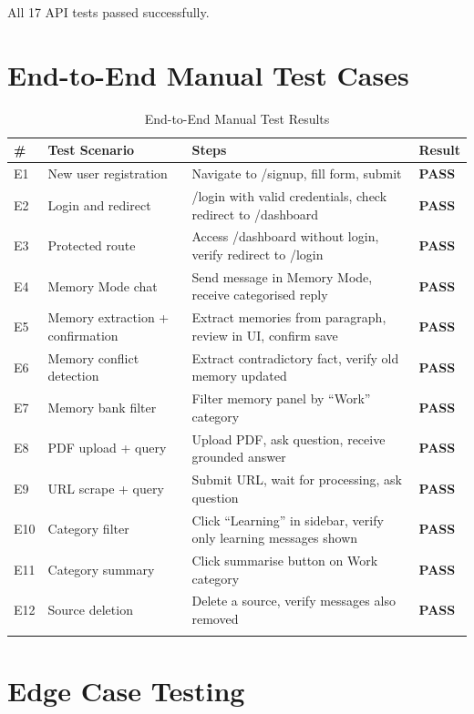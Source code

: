 \documentclass[12pt,a4paper]{report}
\begin{document}
All 17 API tests passed successfully.

\section{End-to-End Manual Test Cases}

\begin{longtable}{@{}p{0.5cm} p{3.5cm} p{5cm} p{3cm}@{}}
\toprule
\textbf{\#} & \textbf{Test Scenario} & \textbf{Steps} & \textbf{Result} \\
\midrule
\endhead
E1 & New user registration & Navigate to /signup, fill form, submit & \textbf{PASS} \\
E2 & Login and redirect & /login with valid credentials, check redirect to /dashboard & \textbf{PASS} \\
E3 & Protected route & Access /dashboard without login, verify redirect to /login & \textbf{PASS} \\
E4 & Memory Mode chat & Send message in Memory Mode, receive categorised reply & \textbf{PASS} \\
E5 & Memory extraction + confirmation & Extract memories from paragraph, review in UI, confirm save & \textbf{PASS} \\
E6 & Memory conflict detection & Extract contradictory fact, verify old memory updated & \textbf{PASS} \\
E7 & Memory bank filter & Filter memory panel by ``Work'' category & \textbf{PASS} \\
E8 & PDF upload + query & Upload PDF, ask question, receive grounded answer & \textbf{PASS} \\
E9 & URL scrape + query & Submit URL, wait for processing, ask question & \textbf{PASS} \\
E10 & Category filter & Click ``Learning'' in sidebar, verify only learning messages shown & \textbf{PASS} \\
E11 & Category summary & Click summarise button on Work category & \textbf{PASS} \\
E12 & Source deletion & Delete a source, verify messages also removed & \textbf{PASS} \\
\bottomrule
\caption{End-to-End Manual Test Results}
\label{tab:e2e_tests}
\end{longtable}

\section{Edge Case Testing}
\end{document}

